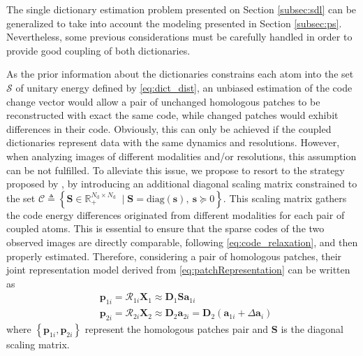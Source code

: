 \documentclass[review]{elsarticle}
\newcommand{\Natom}{N_{\mathrm{d}}}
\begin{document}
The single dictionary estimation problem presented on Section \ref{subsec:sdl} can be generalized to take into account the modeling presented in Section \ref{subsec:ps}. Nevertheless, some previous considerations must be carefully handled in order to provide good coupling of both dictionaries.

As the prior information about the dictionaries constrains each atom into the set $\mathcal{S}$ of unitary energy defined by \eqref{eq:dict_dist}, an unbiased estimation of the code change vector would allow a pair of unchanged homologous patches to be reconstructed  with exact the same code, while changed patches would exhibit differences in their code. Obviously, this can only be achieved if the coupled dictionaries represent data with the same dynamics and resolutions. However, when analyzing images of different modalities and/or resolutions, this assumption can be not fulfilled. To alleviate this issue, we propose to resort to the strategy proposed by \citet{seichepine_soft_2014}, by introducing an additional diagonal scaling matrix constrained to the set $\mathcal{C} \triangleq \left\{\mathbf{S} \in \mathbb{R}^{\Natom \times \Natom}_{+} \; \mid \mathbf{S} = \mathrm{diag}(\mathbf{s}),\ \mathbf{s}\succeq 0 \right\}$. This scaling matrix gathers the code energy differences originated from different modalities for each pair of coupled atoms. This is essential to ensure that the sparse codes of the two observed images are directly comparable, following \eqref{eq:code_relaxation}, and then properly estimated. Therefore, considering a pair of homologous patches, their joint representation model derived from \eqref{eq:patchRepresentation} can be written as
\begin{equation}
	\label{eq:coupled_patchRepresentation}
    \begin{aligned}
	&\mathbf{p}_{1{i}} = \mathcal{R}_{1{i}}\mathbf{X}_{1}  \approx \mathbf{D}_{1}\mathbf{S}\mathbf{a}_{1{i}}\\
	&\mathbf{p}_{2{i}} = \mathcal{R}_{2{i}}\mathbf{X}_{2} \approx \mathbf{D}_{2}\mathbf{a}_{2{i}} = \mathbf{D}_{2}\left(\mathbf{a}_{1{i}} + \Delta\mathbf{a}_{i}\right)
	\end{aligned}
\end{equation}
where $\left\{\mathbf{p}_{1{i}},\mathbf{p}_{2{i}}\right\}$
represent the homologous patches pair and $\mathbf{S}$ is the diagonal scaling matrix.
\end{document}

